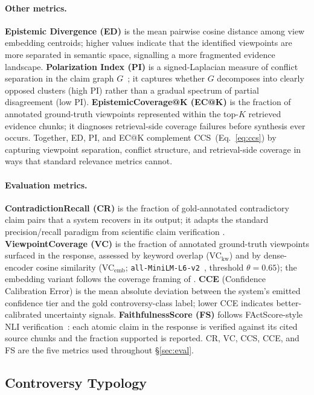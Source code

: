 \documentclass[11pt]{article}
\begin{document}
\paragraph{Other metrics.}
\textbf{Epistemic Divergence (ED)} is the mean pairwise cosine distance among
view embedding centroids; higher values indicate that the identified viewpoints
are more separated in semantic space, signalling a more fragmented evidence
landscape.
\textbf{Polarization Index (PI)} is a signed-Laplacian measure of conflict
separation in the claim graph $G$~\citep{traag2009community}; it captures
whether $G$ decomposes into clearly opposed clusters (high PI) rather than a
gradual spectrum of partial disagreement (low PI).
\textbf{EpistemicCoverage@K (EC@K)} is the fraction of annotated ground-truth
viewpoints represented within the top-$K$ retrieved evidence chunks; it
diagnoses retrieval-side coverage failures before synthesis ever occurs.
Together, ED, PI, and EC@K complement CCS~(Eq.~\ref{eq:ccs}) by capturing
viewpoint separation, conflict structure, and retrieval-side coverage in ways
that standard relevance metrics cannot.

\paragraph{Evaluation metrics.}
\textbf{ContradictionRecall (CR)} is the fraction of gold-annotated
contradictory claim pairs that a system recovers in its output; it adapts
the standard precision/recall paradigm from scientific claim verification
\citep{wadden2020scifact}.
\textbf{ViewpointCoverage (VC)} is the fraction of annotated ground-truth
viewpoints surfaced in the response, assessed by keyword overlap
(VC$_\text{kw}$) and by dense-encoder cosine similarity
(VC$_\text{emb}$; \texttt{all-MiniLM-L6-v2}~\citep{reimers2019sentence},
threshold $\theta{=}0.65$); the embedding variant follows the coverage
framing of \citet{malaviya2024expertqa}.
\textbf{CCE} (Confidence Calibration Error) is the mean absolute deviation
between the system's emitted confidence tier and the gold controversy-class
label; lower CCE indicates better-calibrated uncertainty signals.
\textbf{FaithfulnessScore (FS)} follows FActScore-style NLI
verification~\citep{min2023factscore}: each atomic claim in the response is
verified against its cited source chunks and the fraction supported is
reported.  CR, VC, CCS, CCE, and FS are the five metrics used throughout
\S\ref{sec:eval}.

\subsection{Controversy Typology}
\label{sec:taxonomy}
\end{document}
